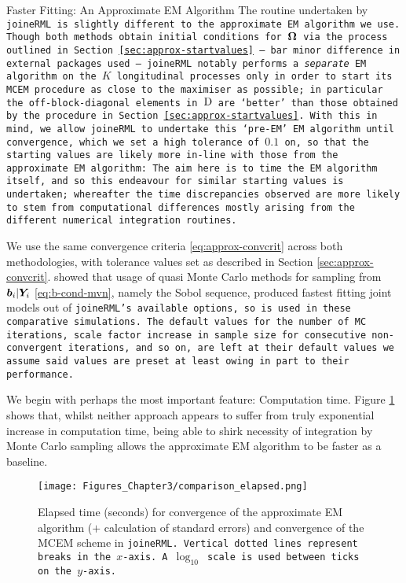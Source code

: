 \begin{chapter}{\label{cha:approx}Faster Fitting: An Approximate EM Algorithm}
  The routine undertaken by \tt{joineRML} is slightly different to the approximate EM algorithm we use. Though both methods obtain initial conditions for $\bm{\mathrm{\Omega}}$ via the process outlined in Section \ref{sec:approx-startvalues} -- bar minor difference in external packages used -- \tt{joineRML} notably performs a \textit{separate} EM algorithm on the $K$ longitudinal processes only in order to start its MCEM procedure as close to the maximiser as possible; in particular the off-block-diagonal elements in $\mathrm{D}$ are `better' than those obtained by the procedure in Section \ref{sec:approx-startvalues}. With this in mind, we allow \tt{joineRML} to undertake this `pre-EM' EM algorithm until convergence, which we set a high tolerance of $0.1$ on, so that the starting values are likely more in-line with those from the approximate EM algorithm: The aim here is to time the EM algorithm itself, and so this endeavour for similar starting values is undertaken; whereafter the time discrepancies observed are more likely to stem from computational differences mostly arising from the different numerical integration routines.

  We use the same convergence criteria \eqref{eq:approx-convcrit} across both methodologies, with tolerance values set as described in Section \ref{sec:approx-convcrit}. \citet{Philipson2020} showed that usage of quasi Monte Carlo methods for sampling from $\bm{b}_i|\bm{Y}_i$ \eqref{eq:b-cond-mvn}, namely the Sobol sequence, produced fastest fitting joint models out of \tt{joineRML}'s available options, so is used in these comparative simulations. The default values for the number of MC iterations, scale factor increase in sample size for consecutive non-convergent iterations, and so on, are left at their default values \ie we assume said values are preset at least owing in part to their performance.

  We begin with perhaps the most important feature: Computation time. Figure \ref{fig:approx-comparisons-comptime} shows that, whilst neither approach appears to suffer from truly exponential increase in computation time, being able to shirk necessity of integration by Monte Carlo sampling allows the approximate EM algorithm to be faster as a baseline.

  \begin{figure}
      \centering
      \texttt{[image: Figures\_Chapter3/comparison\_elapsed.png]}
      \caption{Elapsed time (seconds) for convergence of the approximate EM algorithm ($+$ calculation of standard errors) and convergence of the MCEM scheme in \tt{joineRML}. Vertical dotted lines represent breaks in the $x$-axis. A $\log_{10}$ scale is used between ticks on the $y$-axis.}
      \label{fig:approx-comparisons-comptime}
  \end{figure}


\end{chapter}
